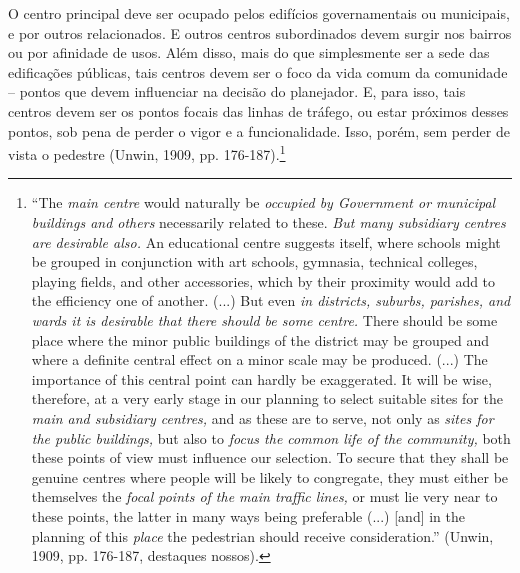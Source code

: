 \documentclass[12pt, a4paper]{book} %
\begin{document}
        O centro principal deve ser ocupado pelos edifícios governamentais ou municipais, e por outros relacionados. E outros centros subordinados devem surgir nos bairros ou por afinidade de usos. Além disso, mais do que simplesmente ser a sede das edificações públicas, tais centros devem ser o foco da vida comum da comunidade – pontos que devem influenciar na decisão do planejador. E, para isso, tais centros devem ser os pontos focais das linhas de tráfego, ou estar próximos desses pontos, sob pena de perder o vigor e a funcionalidade. Isso, porém, sem perder de vista o pedestre (Unwin, 1909, pp. 176-187).\footnote[55]{``The \textit{main centre} would naturally be \textit{occupied by Government or municipal buildings and others} necessarily related to these. \textit{But many subsidiary centres are desirable also.} An educational centre suggests itself, where schools might be grouped in conjunction with art schools, gymnasia, technical colleges, playing fields, and other accessories, which by their proximity would add to the efficiency one of another. (...) But even \textit{in districts, suburbs, parishes, and wards it is desirable that there should be some centre.} There should be some place where the minor public buildings of the district may be grouped and where a definite central effect on a minor scale may be produced. (...) The importance of this central point can hardly be exaggerated. It will be wise, therefore, at a very early stage in our planning to select suitable sites for the \textit{main and subsidiary centres,} and as these are to serve, not only as \textit{sites for the public buildings,} but also to \textit{focus the common life of the community,} both these points of view must influence our selection. To secure that they shall be genuine centres where people will be likely to congregate, they must either be themselves the \textit{focal points of the main traffic lines,} or must lie very near to these points, the latter in many ways being preferable (...) [and] in the planning of this \textit{place} the pedestrian should receive consideration.'' (Unwin, 1909, pp. 176-187, destaques nossos).}
\end{document}
